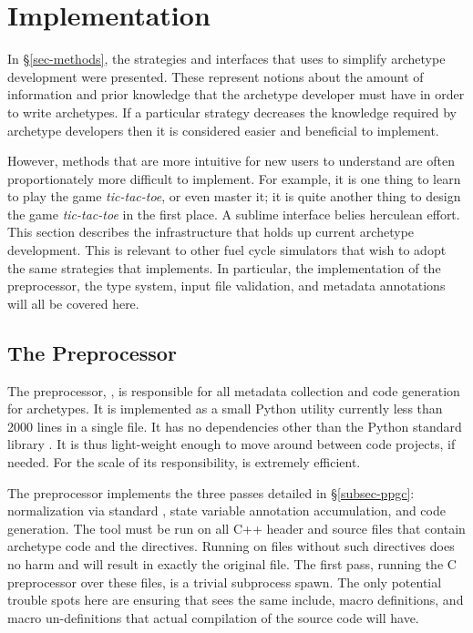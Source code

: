 \section{Implementation}
\label{sec-impl}

In \S \ref{sec-methods}, the strategies and interfaces that \Cyclus uses to 
simplify archetype development were presented. These represent notions about
the amount of information and prior knowledge that the archetype developer 
must have in order to write archetypes.  If a particular strategy 
decreases the knowledge required by archetype developers then it is considered
easier and beneficial to implement.  

However, methods that are more intuitive for new users to understand are often
proportionately more difficult to implement. For example, it is one thing to 
learn to play the game \emph{tic-tac-toe}, or even master it; it is quite another
thing to design the game \emph{tic-tac-toe} in the first place.  
A sublime interface belies 
herculean effort. This section describes the infrastructure that holds up 
current \cyclus archetype development.  This is relevant to other fuel 
cycle simulators that wish to adopt the same strategies that \cyclus 
implements. In particular, the implementation of the \cyclus preprocessor, 
the type system, input file validation, and metadata annotations will all 
be covered here.

\subsection{The \Cyclus Preprocessor}

The \cyclus preprocessor, \cycpp, is responsible for all metadata collection and 
code generation for archetypes. It is implemented as a small Python utility 
currently less than 2000 lines in a single file.  It has no dependencies other 
than the Python standard library \citeme. It is thus light-weight enough to move around 
between code projects, if needed. For the scale of its responsibility, \cycpp
is extremely efficient. 

The preprocessor implements the three passes detailed in \S\ref{subsec-ppgc}:
normalization via standard , state variable annotation accumulation, and code 
generation. The \cycpp tool must be run on all C++ header and source files that
contain archetype code and the  directives. Running \cycpp
on files without such directives does no harm and will result in exactly the 
original file. The first \cycpp
pass, running the C preprocessor over these files, is a trivial subprocess 
spawn. The only potential trouble spots here are ensuring that \cycpp sees the
same include, macro definitions, and macro un-definitions that actual compilation 
of the source code will have.


